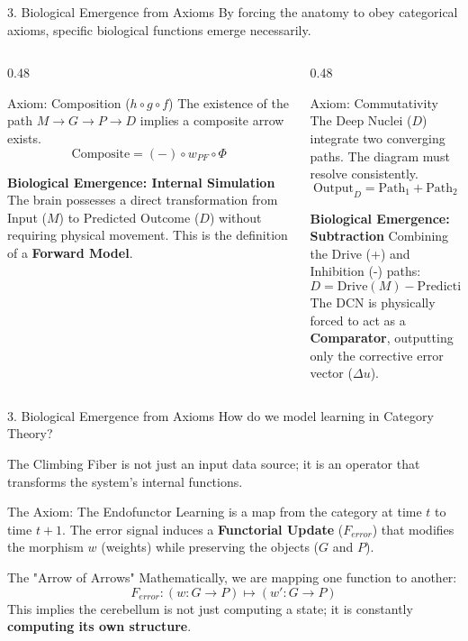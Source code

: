 \documentclass[10pt]{beamer}
\begin{document}
\begin{frame}{3. Biological Emergence from Axioms}
	By forcing the anatomy to obey categorical axioms, specific biological functions emerge necessarily.

	\begin{columns}
		\begin{column}{0.48\textwidth}
			\begin{block}{Axiom: Composition ($h \circ g \circ f$)}
				The existence of the path $M \to G \to P \to D$ implies a composite arrow exists.
				\[ \text{Composite} = (-) \circ w_{PF} \circ \Phi \]
			\end{block}
			\textbf{Biological Emergence: Internal Simulation}
			The brain possesses a direct transformation from Input ($M$) to Predicted Outcome ($D$) without requiring physical movement. This is the definition of a \textbf{Forward Model}.
		\end{column}
		
		\begin{column}{0.48\textwidth}
			\begin{block}{Axiom: Commutativity}
				The Deep Nuclei ($D$) integrate two converging paths. The diagram must resolve consistently.
				\[ \text{Output}_D = \text{Path}_1 + \text{Path}_2 \]
			\end{block}
			\textbf{Biological Emergence: Subtraction}
			Combining the Drive (+) and Inhibition (-) paths:
			\[ D = \text{Drive}(M) - \text{Prediction}(P) \]
			The DCN is physically forced to act as a \textbf{Comparator}, outputting only the corrective error vector ($\Delta u$).
		\end{column}
	\end{columns}
\end{frame}

\begin{frame}{3. Biological Emergence from Axioms}
	How do we model learning in Category Theory?
	
	The Climbing Fiber is not just an input data source; it is an operator that transforms the system's internal functions.
	
	\vspace{0.5cm}
	
	\begin{block}{The Axiom: The Endofunctor}
		Learning is a map from the category at time $t$ to time $t+1$. 
		The error signal induces a \textbf{Functorial Update} ($F_{error}$) that modifies the morphism $w$ (weights) while preserving the objects ($G$ and $P$).
	\end{block}
	
	\vspace{0.3cm}
	
	\begin{block}{The "Arrow of Arrows"}
		Mathematically, we are mapping one function to another:
		\[ F_{error}: (w: G \to P) \longmapsto (w': G \to P) \]
		This implies the cerebellum is not just computing a state; it is constantly \textbf{computing its own structure}.
	\end{block}
\end{frame}
\end{document}
